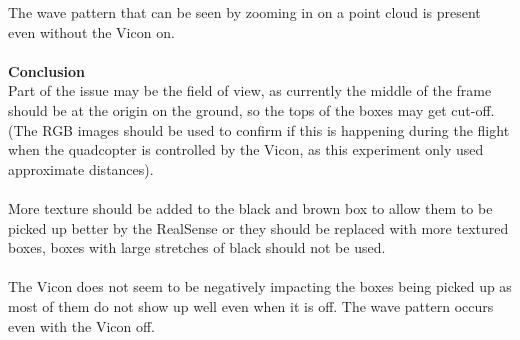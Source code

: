 \documentclass[12pt,a4paper]{article}
\begin{document}
\noindent
The wave pattern that can be seen by zooming in on a point cloud is present even without the Vicon on.
\\\\
\textbf{Conclusion} \\
Part of the issue may be the field of view, as currently the middle of the frame should be at the origin on the ground, so the tops of the boxes may get cut-off. (The RGB images should be used to confirm if this is happening during the flight when the quadcopter is controlled by the Vicon, as this experiment only used approximate distances).
\\\\
More texture should be added to the black and brown box to allow them to be picked up better by the RealSense or they should be replaced with more textured boxes, boxes with large stretches of black should not be used.
\\\\
The Vicon does not seem to be negatively impacting the boxes being picked up as most of them do not show up well even when it is off. The wave pattern occurs even with the Vicon off.
\end{document}
